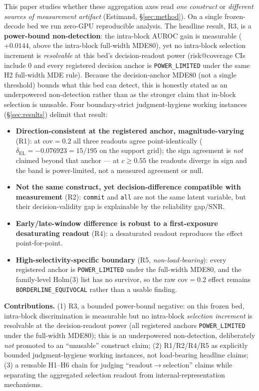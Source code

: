 \documentclass{article}
\begin{document}
This paper studies whether these aggregation axes read \emph{one construct} or
\emph{different sources of measurement artifact} (Estimand, \S\ref{sec:method}). On a single
frozen-decode bed we run zero-GPU reproducible analysis. The headline result, R3, is a
\textbf{power-bound non-detection}: the intra-block AUROC gain is measurable ($+0.0144$,
above the intra-block full-width MDE80), yet no intra-block selection increment is
\emph{resolvable} at this bed's decision-readout power (risk@coverage CIs include 0 and
every registered decision anchor is \texttt{POWER\_LIMITED} under the same H2 full-width
MDE rule). Because the decision-anchor MDE80 (not a single threshold) bounds what this bed
can detect, this is honestly stated as an underpowered non-detection rather than as the
stronger claim that in-block selection is unusable. Four boundary-strict judgment-hygiene
working instances (\S\ref{sec:results}) delimit that result:

\begin{itemize}
  \item \textbf{Direction-consistent at the registered anchor, magnitude-varying} (R1):
  at cov$=0.2$ all three readouts agree point-identically
  ($\delta_{\mathrm{EL}}{=}-0.076923{=}15/195$ on the support grid); the sign agreement is
  \emph{not} claimed beyond that anchor --- at $c\ge0.55$ the readouts diverge in sign and
  the band is power-limited, not a measured agreement or null.
  \item \textbf{Not the same construct, yet decision-difference compatible with measurement}
  (R2): \texttt{commit} and \texttt{all} are not the same latent variable, but their
  decision-validity gap is explainable by the reliability gap/SNR.
  \item \textbf{Early/late-window difference is robust to a first-exposure desaturating readout} (R4): a
  desaturated readout reproduces the effect point-for-point.
  \item \textbf{High-selectivity-specific boundary} (R5, \emph{non-load-bearing}): every
  registered anchor is \texttt{POWER\_LIMITED} under the full-width MDE80, and the
  family-level Holm(3) list has no survivor, so the raw cov$=0.2$ effect remains
  \texttt{BORDERLINE\_EQUIVOCAL} rather than a usable finding.
\end{itemize}

\textbf{Contributions.} (1) R3, a bounded power-bound negative: on this frozen bed, intra-block
discrimination is measurable but no intra-block \emph{selection increment} is resolvable at the
decision-readout power (all registered anchors \texttt{POWER\_LIMITED} under the full-width MDE80);
this is an underpowered non-detection, deliberately \emph{not} promoted to an ``unusable'' construct
claim; (2) R1/R2/R4/R5 as explicitly bounded judgment-hygiene working instances, not load-bearing
headline claims; (3) a reusable H1--H6 chain for judging ``readout$\rightarrow$selection'' claims
while separating the aggregated selection readout from internal-representation mechanisms.
\end{document}

